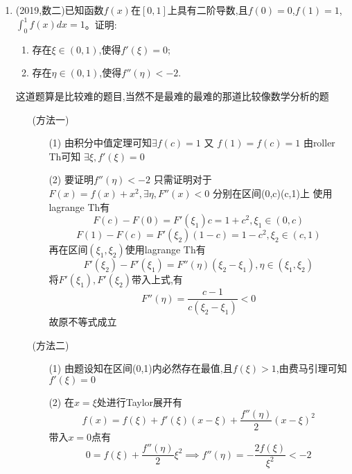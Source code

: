 \documentclass[12pt, a4paper, oneside, UTF8]{ctexbook}
\begin{document}
\begin{enumerate}[label=\arabic*.,start=28]
    \item  (2019,数二)已知函数$f(x)$在$[0,1]$上具有二阶导数,且$f(0)=0$,$f(1)=1$,$\int_0^1 f(x)dx=1$。证明:
    \begin{enumerate}[label=(\roman*)]
        \item 存在$\xi\in(0,1)$,使得$f'(\xi)=0$;
        \item 存在$\eta\in(0,1)$,使得$f''(\eta)<-2$.
    \end{enumerate}
    
    \begin{solution}
    这道题算是比较难的题目,当然不是最难的最难的那道比较像数学分析的题
    \begin{enumerate}
        \item [(方法一)]
        \begin{enumerate}
            \item [(1)] 由积分中值定理可知$\exists f(c)=1$ 又 $f(1)=f(c)=1$ 由roller Th可知
            $\exists\xi,f'(\xi) = 0$ 
            \item [(2)]  
            要证明$f''(\eta)< -2$ 只需证明对于$F(x)=f(x)+x^2,\exists\eta, F''(x)<0$ 分别在区间(0,c)(c,1)上
            使用lagrange Th有
            $$
            F(c)-F(0)=F'(\xi_1)c =1+c^2,\xi_1\in(0,c)
            $$
            $$
            F(1)-F(c)=F'(\xi_2)(1-c)=1-c^2,\xi_2\in(c,1)
            $$
            再在区间$(\xi_1,\xi_2)$使用lagrange Th有
            $$
            F'(\xi_2)-F'(\xi_1) = F''(\eta)(\xi_2-\xi_1), \eta\in(\xi_1,\xi_2)
            $$
            将$F'(\xi_1),F'(\xi_2)$带入上式,有 
            $$
            F''(\eta)=\frac{c-1}{c(\xi_2-\xi_1)} < 0
            $$
            故原不等式成立
        \end{enumerate}
        \item[(方法二)]
        \begin{enumerate}
            \item [(1)] 由题设知在区间(0,1)内必然存在最值,且$f(\xi)>1$,由费马引理可知$f'(\xi) = 0$
            \item [(2)] 在$x=\xi$处进行Taylor展开有
            $$
            f(x)=f(\xi)+f'(\xi)(x-\xi)+\frac{f''(\eta)}{2}(x-\xi)^2
            $$
            带入$x=0$点有
            $$
            0 = f(\xi)+\frac{f''(\eta)}{2}\xi^2  \implies f''(\eta)=-\frac{2f(\xi)}{\xi^2} < -2 
            $$
        \end{enumerate}
    \end{enumerate}
    \end{solution}
\end{enumerate}

\ifx\allfiles\undefined
\end{document}
